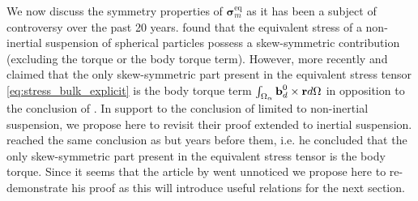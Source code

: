 We now discuss the symmetry properties of $\bm\sigma^\text{eq}_m$ as it has been a subject of controversy over the past 20 years.
\citet{prosperetti2006stress} found that the equivalent stress of a non-inertial suspension of spherical particles possess a skew-symmetric contribution (excluding the torque or the body torque term). 
However, more recently \citet{zhou2020lamb} and \citet{dolata2020heterogeneous} claimed that the only skew-symmetric part present in the equivalent stress tensor \eqref{eq:stress_bulk_explicit} is the body torque term $\int_{\Omega_{\alpha}} \textbf{b}_d^0 \times \textbf{r} d\Omega$ in opposition to the conclusion of \citep{prosperetti2006stress}.
In support to the conclusion of  \citet{dolata2020heterogeneous} limited to non-inertial suspension, we propose here to revisit their proof extended to inertial suspension. 
\citet{lhuillier1996contribution} reached the same conclusion as \citet{dolata2020heterogeneous} but years before them, i.e. he concluded that the only skew-symmetric part present in the equivalent stress tensor is the body torque. 
Since it seems that the article by \citet{lhuillier1996contribution} went unnoticed we propose here to re-demonstrate his proof as this will introduce useful relations for the next section. 

